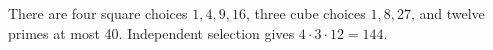 There are four square choices $1,4,9,16$, three cube choices $1,8,27$, and twelve primes at most 40. Independent selection gives $4\cdot3\cdot12=\boxed{144}$.
